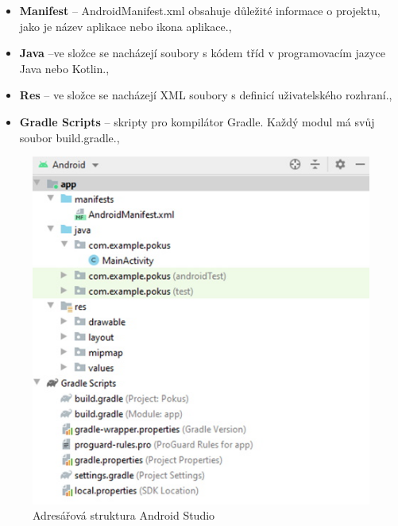 \documentclass{vskpou} %
\begin{document}
\begin{itemize}
    \item \textbf{Manifest} -- AndroidManifest.xml obsahuje důležité informace o projektu, jako je název aplikace nebo ikona aplikace.\cite{1},\cite{17}  
    
    \item \textbf{Java} --ve složce se nacházejí soubory s kódem tříd v programovacím jazyce Java nebo Kotlin.\cite{1},\cite{17} 
    
    \item \textbf{Res} -- ve složce se nacházejí XML soubory s definicí uživatelského rozhraní.\cite{1},\cite{17} 
    

    
    \item \textbf{Gradle Scripts} -- skripty pro kompilátor Gradle. Každý modul má svůj soubor build.gradle.\cite{1},\cite{17} 
    
   
\end{itemize}
 \begin{figure}[h!]
\centering
\includegraphics[scale=0.5]{images/5.jpg}
\caption{Adresářová struktura Android Studio}
\label{5}
\end{figure}
\newpage
\end{document}
